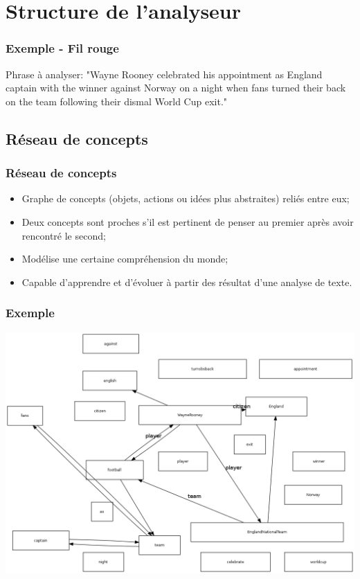 \documentclass{beamer}
\begin{document}
\section{Structure de l'analyseur}%
    \begin{frame}
        \frametitle{Exemple - Fil rouge}
        Phrase à analyser:\newline{}
        "Wayne Rooney celebrated his appointment as England captain with the winner against Norway on a night when
        fans turned their back on the team following their dismal World Cup exit."
    \end{frame}

    \subsection{Réseau de concepts}
        \begin{frame}
        \frametitle{Réseau de concepts}
            \begin{itemize}
                \item Graphe de concepts (objets, actions ou idées plus abstraites) reliés entre eux;
                \item Deux concepts sont proches s'il est pertinent de penser au premier après avoir rencontré le second;
                \item Modélise une certaine compréhension du monde;
                \item Capable d'apprendre et d'évoluer à partir des résultat d'une analyse de texte.
            \end{itemize}
        \end{frame}

        \begin{frame}
        \frametitle{Exemple}
            \includegraphics[height=0.8\textheight]{RC/figures/RCetape0.png}
        \end{frame}
\end{document}
